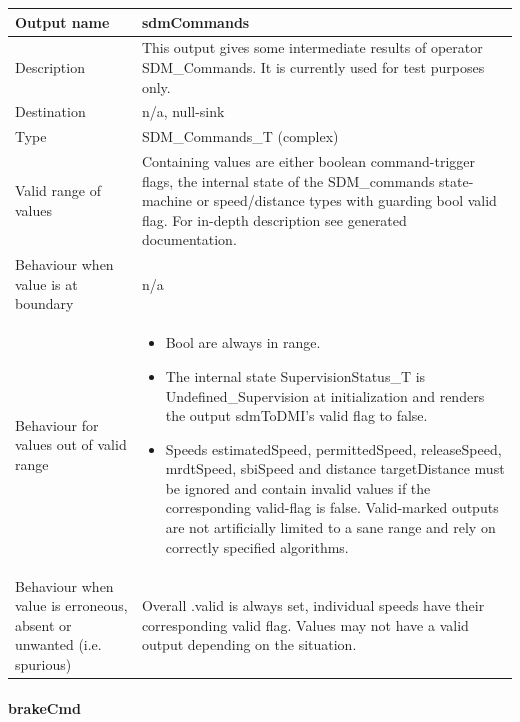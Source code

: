 \begin{longtable}{p{}p{}}
\toprule
Output name				& sdmCommands \\
\midrule
Description				& This output gives some intermediate results of operator SDM\_Commands. It is currently used for test purposes only. \\
\midrule
Destination				& n/a, null-sink \\ 
\midrule
Type					& SDM\_Commands\_T (complex) \\
\midrule
Valid range of values	& Containing values are either boolean command-trigger flags, the internal state of the SDM\_commands state-machine or speed/distance types with guarding bool valid flag. For in-depth description see generated documentation.\\
\midrule
Behaviour when value is at boundary	& n/a \\
\midrule
Behaviour for values out of valid range	& 
\begin{itemize}
\item Bool are always in range.
\item The internal state SupervisionStatus\_T is Undefined\_Supervision at initialization and renders the output sdmToDMI's valid flag to false.
\item Speeds estimatedSpeed, permittedSpeed, releaseSpeed, mrdtSpeed, sbiSpeed and distance targetDistance must be ignored and contain invalid values if the corresponding valid-flag is false. Valid-marked outputs are not artificially limited to a sane range and rely on correctly specified algorithms.
\end{itemize}\\
\midrule
Behaviour when value is erroneous, absent or unwanted (i.e. spurious) & Overall .valid is always set, individual speeds have their corresponding valid flag. Values may not have a valid output depending on the situation. \\
\bottomrule
\end{longtable}

\paragraph{brakeCmd}

